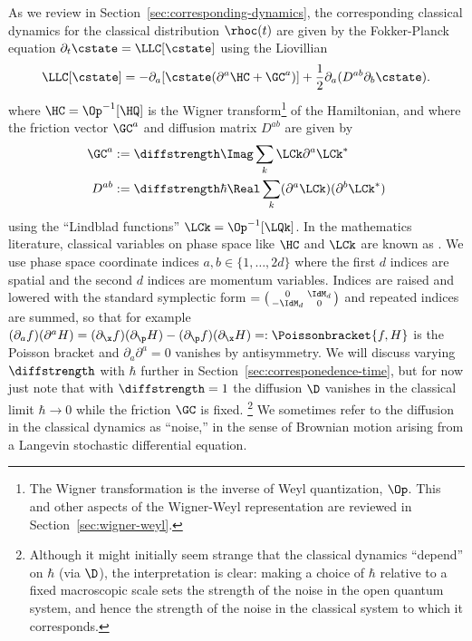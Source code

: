 \documentclass{article}
\numberwithin{equation}{section}
\begin{document}
As we review in Section~\ref{sec:corresponding-dynamics}, the corresponding
classical dynamics for the classical distribution $\rhoc(t)$ 
are given by the Fokker-Planck equation $\partial_t \cstate = \LLC[\cstate]$ 
using the Liovillian \cite{risken1984fokkerplanck, gardiner2009stochastic}
\begin{equation}
    \label{eq:fp-simple}
    \LLC[\cstate] = -\partial_a [\cstate (\partial^a \HC + \GC^a)]  +	 \frac12 \partial_a (D^{ab} \partial_b \cstate).
\end{equation}
where $\HC=\Op^{-1}[\HQ]$ is the Wigner transform\footnote{The Wigner transformation is the inverse of Weyl quantization, $\Op$. This and other aspects of the Wigner-Weyl representation are reviewed in Section~\ref{sec:wigner-weyl}.} of the Hamiltonian, and where the friction vector $\GC^a$ and diffusion matrix $D^{ab}$ are given by 
\begin{align}
\GC^a &:=  \diffstrength \Imag \sum_k \LCk \partial^a \LCk^* \\
\label{Dab-first-def}
D^{ab} &:=  \diffstrength \hbar \Real \sum_k (\partial^a \LCk )( \partial^b \LCk^*)
\end{align}
using the ``Lindblad functions''  $\LCk=\Op^{-1}[\LQk]$.
In the mathematics literature, classical variables on phase space like $\HC$ and $\LCk$ are known as .
We use phase space coordinate indices  $a,b \in \{1,\ldots,2d\}$ 
where the first $d$ indices are spatial and the second $d$ indices are momentum variables.  Indices are raised and lowered with the standard symplectic form $\sf=\left(\begin{smallmatrix}0 & \IdM_d \\ -\IdM_d & 0\end{smallmatrix}\right)$ and repeated indices are summed, so that for example $(\partial_a f)( \partial^a H) = (\partial_\x f)( \partial_\p H)-(\partial_\p f)( \partial_\x H) =: \Poissonbracket{f,H}$ is the Poisson bracket and $\partial_a\partial^a = 0$ vanishes by antisymmetry.  We will discuss varying $\diffstrength$ with $\hbar$ further in Section~\ref{sec:corresponedence-time}, but for now just note that with $\diffstrength=1$ the diffusion $\D$ vanishes in the classical limit $\hbar\to 0$ while the friction $\GC$ is fixed.
\footnote{Although it might initially seem strange that the classical dynamics ``depend'' on $\hbar$ (via $\D$), the interpretation is clear: making a choice of $\hbar$ relative to a fixed macroscopic scale sets the strength of the noise in the open quantum system, and hence the strength of the noise in the classical system to which it corresponds.} 
We sometimes refer to the diffusion in the classical dynamics as ``noise,'' in the sense of
Brownian motion arising from a Langevin stochastic differential equation.
\end{document}
